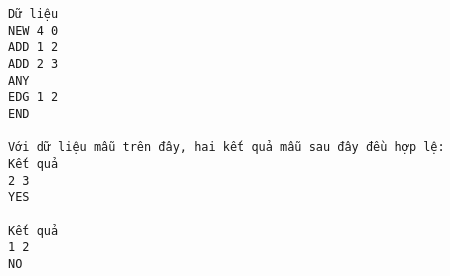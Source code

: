 \begin{verbatim}
Dữ liệu
NEW 4 0
ADD 1 2
ADD 2 3
ANY
EDG 1 2
END

Với dữ liệu mẫu trên đây, hai kết quả mẫu sau đây đều hợp lệ:
Kết quả
2 3
YES

Kết quả
1 2
NO
\end{verbatim}